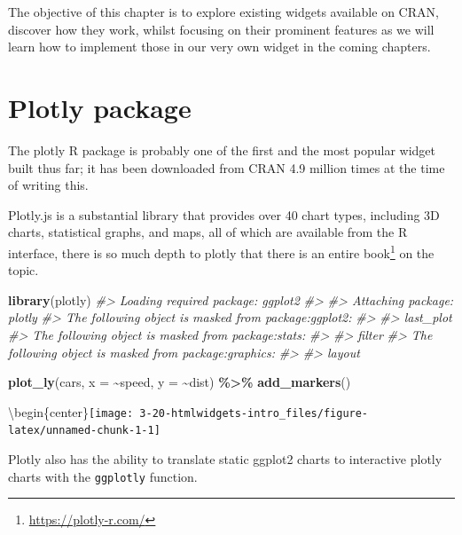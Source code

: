 \documentclass[
]{krantz}
\makeatletter
\newenvironment{Shaded}{\begin{snugshade}}{\end{snugshade}}
\newcommand{\CommentTok}[1]{\textcolor[rgb]{0.37,0.37,0.37}{\textit{#1}}}
\newcommand{\DataTypeTok}[1]{\textcolor[rgb]{0.27,0.27,0.27}{#1}}
\newcommand{\KeywordTok}[1]{\textcolor[rgb]{0.27,0.27,0.27}{\textbf{#1}}}
\newcommand{\NormalTok}[1]{#1}
\newcommand{\OperatorTok}[1]{\textcolor[rgb]{0.43,0.43,0.43}{\textbf{#1}}}
\newcommand{\StringTok}[1]{\textcolor[rgb]{0.5,0.5,0.5}{#1}}
\renewcommand{\href}[2]{#2\footnote{\url{#1}}}
\newenvironment{kframe}{%
\medskip{}
\setlength{\fboxsep}{.8em}
 \def\at@end@of@kframe{}%
 \ifinner\ifhmode%
  \def\at@end@of@kframe{\end{minipage}}%
  \begin{minipage}{\columnwidth}%
 \fi\fi%
 \def\FrameCommand##1{\hskip\@totalleftmargin \hskip-\fboxsep
 \colorbox{shadecolor}{##1}\hskip-\fboxsep
     \hskip-\linewidth \hskip-\@totalleftmargin \hskip\columnwidth}%
 \MakeFramed {\advance\hsize-\width
   \@totalleftmargin\z@ \linewidth\hsize
   \@setminipage}}%
 {\par\unskip\endMakeFramed%
 \at@end@of@kframe}
\renewenvironment{Shaded}{\begin{kframe}}{\end{kframe}}
\makeatother
\begin{document}
The objective of this chapter is to explore existing widgets available on CRAN, discover how they work, whilst focusing on their prominent features as we will learn how to implement those in our very own widget in the coming chapters.

\hypertarget{widgets-plotly}{%
\section{Plotly package}\label{widgets-plotly}}

The plotly \citep{R-plotly} R package is probably one of the first and the most popular widget built thus far; it has been downloaded from CRAN 4.9 million times at the time of writing this.

Plotly.js is a substantial library that provides over 40 chart types, including 3D charts, statistical graphs, and maps, all of which are available from the R interface, there is so much depth to plotly that there is an entire \href{https://plotly-r.com/}{book} on the topic.

\begin{Shaded}
\begin{Highlighting}[]
\KeywordTok{library}\NormalTok{(plotly)}
\CommentTok{\#> Loading required package: ggplot2}
\CommentTok{\#> }
\CommentTok{\#> Attaching package: \textquotesingle{}plotly\textquotesingle{}}
\CommentTok{\#> The following object is masked from \textquotesingle{}package:ggplot2\textquotesingle{}:}
\CommentTok{\#> }
\CommentTok{\#>     last\_plot}
\CommentTok{\#> The following object is masked from \textquotesingle{}package:stats\textquotesingle{}:}
\CommentTok{\#> }
\CommentTok{\#>     filter}
\CommentTok{\#> The following object is masked from \textquotesingle{}package:graphics\textquotesingle{}:}
\CommentTok{\#> }
\CommentTok{\#>     layout}

\KeywordTok{plot\_ly}\NormalTok{(cars, }\DataTypeTok{x =} \OperatorTok{\textasciitilde{}}\NormalTok{speed, }\DataTypeTok{y =} \OperatorTok{\textasciitilde{}}\NormalTok{dist) }\OperatorTok{\%>\%}\StringTok{ }
\StringTok{  }\KeywordTok{add\_markers}\NormalTok{()}
\end{Highlighting}
\end{Shaded}

\textbackslash begin\{center\}\texttt{[image: 3-20-htmlwidgets-intro\_files/figure-latex/unnamed-chunk-1-1]}

Plotly also has the ability to translate static ggplot2 \citep{R-ggplot2} charts to interactive plotly charts with the \texttt{ggplotly} function.
\end{document}
